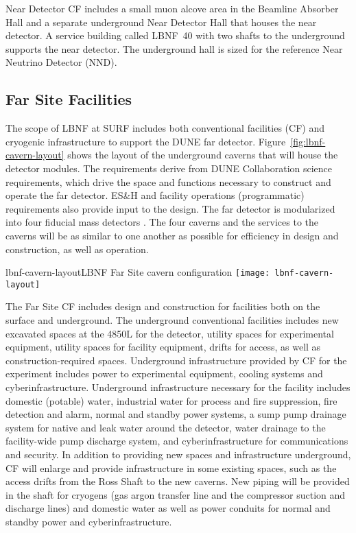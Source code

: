 Near Detector CF includes a small muon alcove area in the Beamline Absorber Hall and a separate underground Near Detector Hall that houses the near detector. A service building called LBNF~40 with two shafts to the underground supports the near detector. The underground hall is sized for the reference Near Neutrino Detector (NND). 

\subsection{Far Site Facilities}

The scope of LBNF at SURF includes both conventional facilities (CF) and cryogenic infrastructure to support the DUNE far detector. Figure~\ref{fig:lbnf-cavern-layout} shows the layout of the underground caverns that will house the detector modules. The requirements derive from DUNE Collaboration science requirements, which drive the space and functions necessary to construct and operate the far detector.  ES\&H and facility operations (programmatic) requirements also provide input to the design. The far detector is modularized into four  fiducial mass detectors . The four caverns and the services to the caverns will be as similar to one another as possible for %
efficiency in design and construction, as well as operation. 

\begin{cdrfigure}{lbnf-cavern-layout}{LBNF Far Site cavern configuration}  
\texttt{[image: lbnf-cavern-layout]}
\end{cdrfigure}


The %
Far Site CF includes design and construction for facilities both on the surface and underground. The underground conventional facilities includes new excavated spaces at the 4850L for the detector, utility spaces for experimental equipment, utility spaces for facility equipment, drifts for access, as well as construction-required spaces. Underground infrastructure provided by CF for the experiment includes power to experimental equipment, cooling systems and cyberinfrastructure. Underground infrastructure necessary for the facility includes domestic (potable) water, industrial water for process and fire suppression, fire detection and alarm, normal and standby power systems, a sump pump drainage system for native and leak water around the detector, water drainage to the facility-wide pump discharge system, and cyberinfrastructure for communications and security.
In addition to providing new spaces and infrastructure underground, CF will enlarge and provide infrastructure in some existing spaces, %
such as the access drifts from the Ross Shaft to the new caverns. New piping will be provided in the shaft for cryogens (gas argon transfer line and the compressor suction and discharge lines) and domestic water as well as power conduits for normal and standby power and cyberinfrastructure. 

